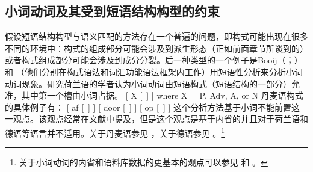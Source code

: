 \begin{exe}
\begin{xlist}[iv.]
\begin{exe}
\begin{xlist}[iv.]
\subsection{小词动词及其受到短语结构构型的约束}
\label{sec-particle-verbs-phrasal}

假设短语结构构型与语义匹配的方法存在一个普遍的问题，即构式可能出现在很多不同的环境中：构式的组成部分可能会涉及到派生形态（正如前面章节所谈到的）或者构式组成部分可能会涉及到成分分裂。后一种类型的一个例子是Booij（\citeyear[\S~2]{Booij2002a}；\citeyear{Booij2012a-u}）和 \citet{Blom2005a}（他们分别在构式语法\indexcxg 和词汇功能语法\indexlfg 框架内工作）用短语性分析来分析小词动词现象。研究荷兰语的学者认为小词动词由短语构式（短语结构的一部分）允准，其中第一个槽由小词占据。
\ea
{}[ X [~] ] where X = P, Adv, A, or N
\z
丹麦语构式的具体例子有：
\eal
\label{particle-konstruktionen}
\ex {}[ af   [~] ]
\ex {}[ door [~] ]
\ex {}[ op   [~] ]
\zl 
这个分析方法基于小词不能前置这一观点。该观点经常在文献中提及，但是这个观点是基于内省的并且对于荷兰语和德语等语言并不适用。关于丹麦语参见 ，关于德语参见 。\footnote{%
关于小词动词的内省和语料库数据的更基本的观点可以参见 和 。
} 

\end{xlist}
\end{exe}
\end{xlist}
\end{exe}
